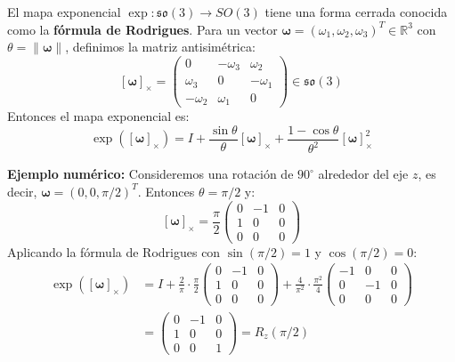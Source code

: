 \begin{example}\label{ex:mapa_exp_so3}
	El mapa exponencial $\exp: \mathfrak{so}(3) \to SO(3)$ tiene una forma cerrada conocida como la \textbf{fórmula de Rodrigues}. Para un vector $\boldsymbol{\omega} = (\omega_1, \omega_2, \omega_3)^T \in \mathbb{R}^3$ con $\theta = \|\boldsymbol{\omega}\|$, definimos la matriz antisimétrica:
	\[
		[\boldsymbol{\omega}]_\times = \begin{pmatrix}
			0 & -\omega_3 & \omega_2 \\
			\omega_3 & 0 & -\omega_1 \\
			-\omega_2 & \omega_1 & 0
		\end{pmatrix} \in \mathfrak{so}(3)
	\]
	Entonces el mapa exponencial es:
	\begin{equation}\label{eq:rodrigues}
		\exp([\boldsymbol{\omega}]_\times) = I + \frac{\sin\theta}{\theta} [\boldsymbol{\omega}]_\times + \frac{1 - \cos\theta}{\theta^2} [\boldsymbol{\omega}]_\times^2
	\end{equation}

	\textbf{Ejemplo numérico:} Consideremos una rotación de $90^\circ$ alrededor del eje $z$, es decir, $\boldsymbol{\omega} = (0, 0, \pi/2)^T$. Entonces $\theta = \pi/2$ y:
	\[
		[\boldsymbol{\omega}]_\times = \frac{\pi}{2} \begin{pmatrix}
			0 & -1 & 0 \\
			1 & 0 & 0 \\
			0 & 0 & 0
		\end{pmatrix}
	\]
	Aplicando la fórmula de Rodrigues con $\sin(\pi/2) = 1$ y $\cos(\pi/2) = 0$:
	\begin{align*}
		\exp([\boldsymbol{\omega}]_\times) &= I + \frac{2}{\pi} \cdot \frac{\pi}{2} \begin{pmatrix}
			0 & -1 & 0 \\
			1 & 0 & 0 \\
			0 & 0 & 0
		\end{pmatrix} + \frac{4}{\pi^2} \cdot \frac{\pi^2}{4} \begin{pmatrix}
			-1 & 0 & 0 \\
			0 & -1 & 0 \\
			0 & 0 & 0
		\end{pmatrix} \\
		&= \begin{pmatrix}
			0 & -1 & 0 \\
			1 & 0 & 0 \\
			0 & 0 & 1
		\end{pmatrix} = R_z(\pi/2)
	\end{align*}


\end{example}
